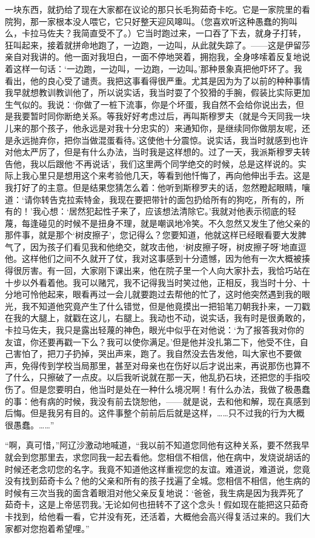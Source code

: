 一块东西，就扔给了现在大家都在议论的那只长毛狗茹奇卡吃。它是一家院里的看院狗，那一家根本没人喂它，它只好整天迎风嗥叫。（您喜欢听这种愚蠢的狗叫么，卡拉马佐夫？我简直受不了。）它当时跑过来，一口吞了下去，就身子打转，狂叫起来，接着就拼命地跑了，一边跑，一边叫，从此就失踪了。——这是伊留莎亲自对我讲的。他一面对我坦白，一面不停地哭着，拥抱我，全身哆嗦着反复地说着这样一句话：‘一边跑，一边叫，一边跑，一边叫。’那种景象真把他吓坏了。我看出，他的良心受了谴责。我把这事看得很严重。尤其是因为为了以前的种种事情我早就想教训教训他了，所以说实话，我当时耍了个狡猾的手腕，假装比实际更加生气似的。我说：‘你做了一桩下流事，你是个坏蛋，我自然不会给你说出去，但是我要暂时同你断绝关系。等我好好考虑过后，再叫斯穆罗夫（就是今天同我一块儿来的那个孩子，他永远是对我十分忠实的）来通知你，是继续同你做朋友呢，还是永远抛弃你，把你当做混蛋看待。’这使他十分震惊。说实话，我当时就感到也许对他太严厉了，但是有什么办法，当时我是这样想的。过了一天，我派斯穆罗夫转告他，我以后跟他‘不再说话’，我们这里两个同学绝交的时候，总是这样说的。实际上我心里只是想用这个来考验他几天，等看到他忏悔了，再向他伸出手去。这是我打好了的主意。但是结果您猜怎么着：他听到斯穆罗夫的话，忽然瞪起眼睛，嚷道：‘请你转告克拉索特金，我现在要把带针的面包扔给所有的狗吃，所有的，所有的！’我心想：‘居然犯起性子来了，应该想法清除它。’我就对他表示彻底的轻蔑，每逢碰见的时候不是扭身不理，就是嘲讽地冷笑。不久忽然又发生了他父亲的那件事，就是那个‘树皮擦子’，您记得么？您要知道，他就这样已经眼看要大发脾气了，因为孩子们看见我和他绝交，就攻击他，‘树皮擦子呀，树皮擦子呀’地直逗他。这样他们之间不久就开了仗，我对这事感到十分遗憾，因为他有一次大概被揍得很厉害。有一回，大家刚下课出来，他在院子里一个人向大家扑去，我恰巧站在十步以外看着他。我可以赌咒，我不记得我当时笑过他，正相反，我当时十分、十分地可怜他起来，眼看再过一会儿就要跑过去帮他的忙了，这时他突然遇到我的眼光，我不知道他究竟产生了什么错觉，但是他竟摸出一把铅笔刀朝我扑来，一刀戳在我的大腿上，就戳在这儿，右腿上。我动也不动，说实话，我有时是很勇敢的，卡拉马佐夫，我只是露出轻蔑的神色，眼光中似乎在对他说：‘为了报答我对你的友谊，你还要再戳一下么？我可以使你满足。’但是他并没扎第二下，他受不住，自己害怕了，把刀子扔掉，哭出声来，跑了。我自然没去告发他，叫大家也不要做声，免得传到学校当局那里，甚至对母亲也在伤好以后才说出来，再说那伤也算不了什么，只擦破了一点皮。以后我听说就在那一天，他乱扔石块，还把您的手指咬伤了。但是您要明白，他当时是处在一种什么境况啊！有什么办法，我做了极愚蠢的事：他有病的时候，我没有前去饶恕他，——就是说，去和他和解，现在真感到后悔。但是我另有目的。这件事整个前前后后就是这样，……只不过我的行为大概很愚蠢。……”
\par “啊，真可惜，”阿辽沙激动地喊道，“我以前不知道您同他有这种关系，要不然我早就会到您那里去，求您同我一起去看他。您相信不相信，他在病中，发烧说胡话的时候还老念叨您的名字。我竟不知道他这样重视您的友谊。难道说，难道说，您竟没有找到茹奇卡么？他的父亲和所有的孩子找遍了全城。您相信不相信，他生病的时候有三次当我的面含着眼泪对他父亲反复地说：‘爸爸，我生病是因为我弄死了茹奇卡，这是上帝惩罚我。’无论如何也扭转不了这个念头！假如现在能把这只茹奇卡找到，给他看一看，它并没有死，还活着，大概他会高兴得复活过来的。我们大家都对您抱着希望哩。”
